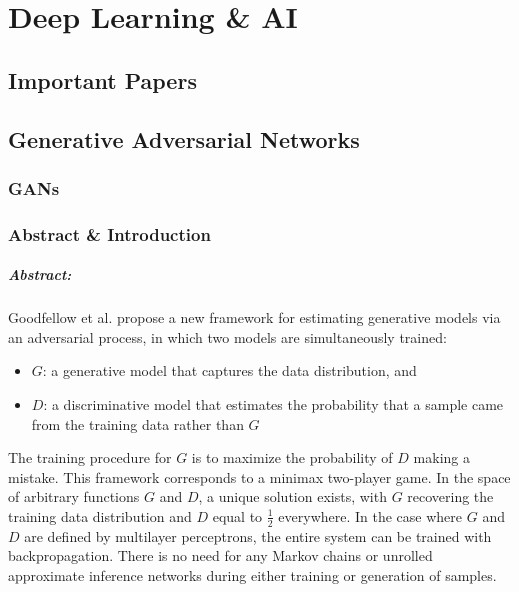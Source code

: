 \chapter{Deep Learning \& AI}

\section{Important Papers}

\cite{goodfellow2016deep}

\cite{Sing1503:Comment}

\section{Generative Adversarial Networks}

\subsection{GANs \cite{goodfellow2014generative}}

\subsection*{Abstract \& Introduction}

\paragraph*{Abstract: } Goodfellow et al. propose a new framework for estimating generative models via an adversarial process, in which two models are simultaneously trained:
\begin{itemize}
\item
	$G$: a generative model that captures the data distribution, and
\item
	$D$: a discriminative model that estimates the probability that a sample came from the training data rather than $G$
\end{itemize}
The training procedure for $G$ is to maximize the probability of $D$ making a mistake. This framework corresponds to a minimax two-player game. In the space of arbitrary functions $G$ and $D$, a unique solution exists, with $G$ recovering the training data distribution and $D$ equal to $\frac{1}{2}$ everywhere. In the case where $G$ and $D$ are defined by multilayer perceptrons, the entire system can be trained with backpropagation. There is no need for any Markov chains or unrolled approximate inference networks during either training or generation of samples.


